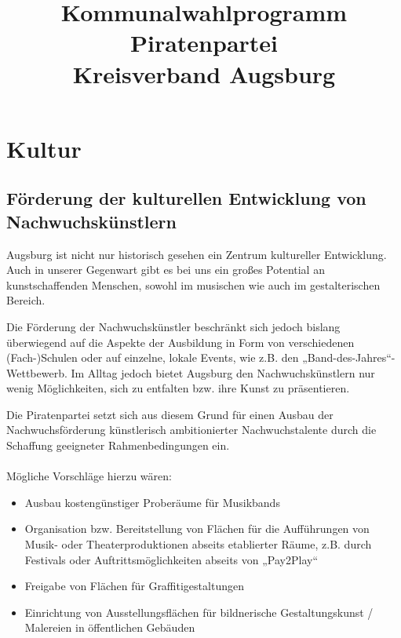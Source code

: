 \documentclass[a5paper, ngerman, 10pt]{scrbook}
\title{\Piraten \color{pgray} Kommunalwahlprogramm\\     
       Piratenpartei\\Kreisverband Augsburg}
\begin{document}
  \maketitle
  
  \tableofcontents
  
  \chapter{Kultur}
  
  \section{Förderung der kulturellen Entwicklung von Nachwuchskünstlern}
  Augsburg ist nicht nur historisch gesehen ein Zentrum kultureller 
  Entwicklung. Auch in unserer Gegenwart gibt es bei uns ein großes Potential 
  an kunstschaffenden Menschen, sowohl im musischen wie auch im 
  gestalterischen Bereich.
  
  Die Förderung der Nachwuchskünstler beschränkt sich jedoch bislang 
  überwiegend auf die Aspekte der Ausbildung in Form von verschiedenen 
  (Fach-)Schulen oder auf einzelne, lokale Events, wie z.B. den 
  „Band-des-Jahres“-Wettbewerb. Im Alltag jedoch bietet Augsburg den 
  Nachwuchskünstlern nur wenig Möglichkeiten, sich zu entfalten bzw. ihre 
  Kunst zu präsentieren.
  
  Die Piratenpartei setzt sich aus diesem Grund für einen Ausbau der 
  Nachwuchsförderung künstlerisch ambitionierter Nachwuchstalente durch die 
  Schaffung geeigneter Rahmenbedingungen ein.\\
  \\
  Mögliche Vorschläge hierzu wären:
  
  \begin{itemize}
    \item Ausbau kostengünstiger Proberäume für Musikbands
    \item Organisation bzw. Bereitstellung von Flächen für die Aufführungen
          von Musik- oder Theaterproduktionen abseits etablierter Räume, z.B. 
          durch Festivals oder Auftrittsmöglichkeiten abseits von „Pay2Play“
    \item Freigabe von Flächen für Graffitigestaltungen
    \item Einrichtung von Ausstellungsflächen für bildnerische 
          Gestaltungskunst / Malereien in öffentlichen Gebäuden 
  \end{itemize}
  
\end{document}

